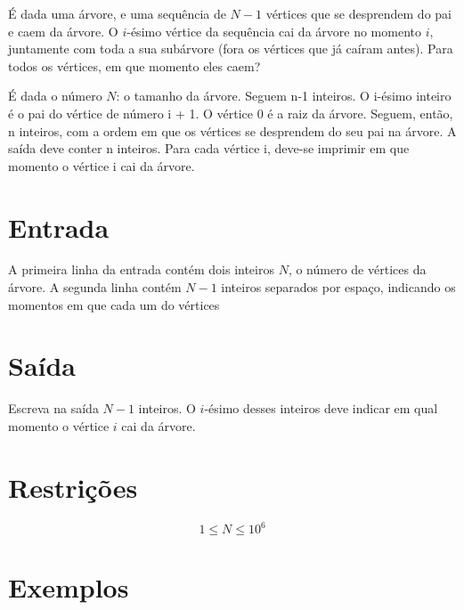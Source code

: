 É dada uma árvore, e uma sequência de $N- 1$ vértices que se desprendem do pai e caem da árvore. O $i$-ésimo vértice da sequência cai da árvore no momento $i$, juntamente com toda a sua subárvore (fora os vértices que já caíram antes). Para todos os vértices, em que momento eles caem?

É dada o número $N$: o tamanho da árvore. Seguem n-1 inteiros. O i-ésimo inteiro é o pai do vértice de número i + 1. O vértice 0 é a raiz da árvore. Seguem, então, n inteiros, com a ordem em que os vértices se desprendem do seu pai na árvore. A saída deve conter n inteiros. Para cada vértice i, deve-se imprimir em que momento o vértice i cai da árvore.

\section*{Entrada}

A primeira linha da entrada contém dois inteiros $N$, o número de vértices da árvore.
A segunda linha contém $N-1$ inteiros separados por espaço, indicando os momentos em que cada um do vértices

\section*{Saída}

Escreva na saída $N-1$ inteiros. O $i$-ésimo desses inteiros deve indicar em qual momento o vértice $i$ cai da árvore.
\section*{Restrições}

$$1 \leq N \leq 10^{6}$$

\section*{Exemplos}
\exemplo
